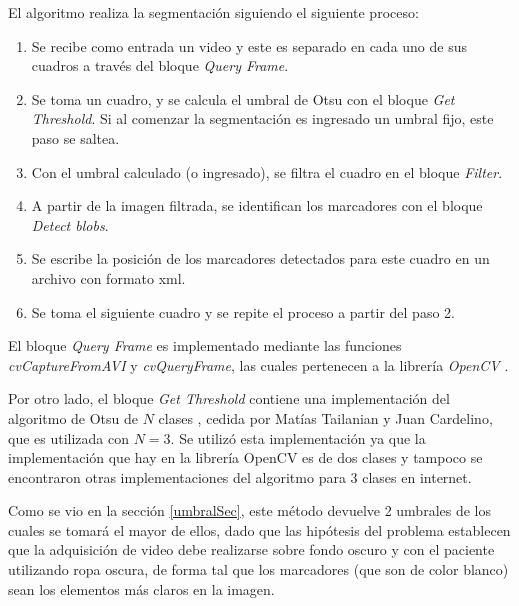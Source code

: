 El algoritmo realiza la segmentación siguiendo el siguiente proceso:

\begin{enumerate}
  \item Se recibe como entrada un video y este es separado en cada uno de sus cuadros a través del bloque \emph{Query Frame}.
  \item Se toma un cuadro, y se calcula el umbral de Otsu con el bloque \emph{Get Threshold}. Si al comenzar la segmentación es ingresado un umbral fijo, este paso se saltea.
  \item Con el umbral calculado (o ingresado), se filtra el cuadro en el bloque \emph{Filter}.
  \item A partir de la imagen filtrada, se identifican los marcadores con el bloque \emph{Detect blobs}.
  \item Se escribe la posición de los marcadores detectados para este cuadro en un archivo con formato xml.
  \item Se toma el siguiente cuadro y se repite el proceso a partir del paso 2.
\end{enumerate}


El bloque \emph{Query Frame} es implementado mediante las funciones \emph{cvCaptureFromAVI} y \emph{cvQueryFrame}, las cuales pertenecen a la librería \emph{OpenCV} \cite{opencv}.


Por otro lado, el bloque \emph{Get Threshold} contiene una implementación del algoritmo de Otsu de $N$ clases \cite{implementacionOtsu}, cedida por Matías Tailanian y Juan Cardelino, que es utilizada con $N=3$. Se utilizó esta implementación ya que la implementación que hay en la librería OpenCV es de dos clases y tampoco se encontraron otras implementaciones del algoritmo para 3 clases en internet.

 Como se vio en la sección \ref{umbralSec}, este método devuelve 2 umbrales de los cuales se tomará el mayor de ellos, dado que las hipótesis del problema establecen que la adquisición de video debe realizarse sobre fondo oscuro y con el paciente utilizando ropa oscura, de forma tal que los marcadores (que son de color blanco) sean los elementos más claros en la imagen.

